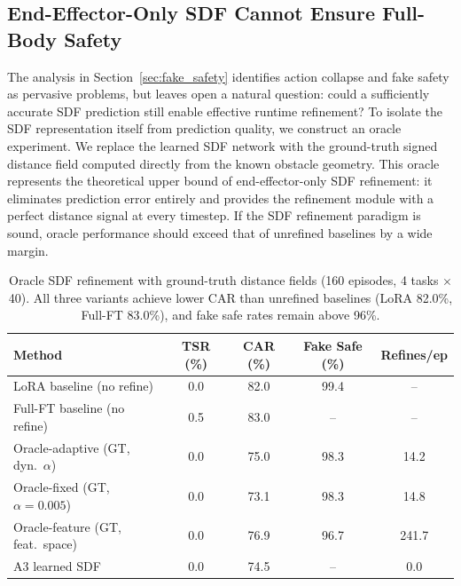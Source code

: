 \subsection{End-Effector-Only SDF Cannot Ensure Full-Body Safety}\label{sec:ee_only}

The analysis in Section~\ref{sec:fake_safety} identifies action collapse and fake safety as pervasive problems, but leaves open a natural question: could a sufficiently accurate SDF prediction still enable effective runtime refinement? To isolate the SDF representation itself from prediction quality, we construct an oracle experiment. We replace the learned SDF network with the ground-truth signed distance field computed directly from the known obstacle geometry. This oracle represents the theoretical upper bound of end-effector-only SDF refinement: it eliminates prediction error entirely and provides the refinement module with a perfect distance signal at every timestep. If the SDF refinement paradigm is sound, oracle performance should exceed that of unrefined baselines by a wide margin.

\begin{table}[t]
\centering
\caption{Oracle SDF refinement with ground-truth distance fields (160 episodes, 4 tasks $\times$ 40). All three variants achieve lower CAR than unrefined baselines (LoRA 82.0\%, Full-FT 83.0\%), and fake safe rates remain above 96\%.}
\label{tab:oracle}
\vspace{2pt}
\small
\begin{tabular}{lcccc}
\toprule
Method & TSR (\%) & CAR (\%) & Fake Safe (\%) & Refines/ep \\
\midrule
LoRA baseline (no refine) & 0.0 & 82.0 & 99.4 & -- \\
Full-FT baseline (no refine) & 0.5 & 83.0 & -- & -- \\
\midrule
Oracle-adaptive (GT, dyn.\ $\alpha$) & 0.0 & 75.0 & 98.3 & 14.2 \\
Oracle-fixed (GT, $\alpha{=}0.005$) & 0.0 & 73.1 & 98.3 & 14.8 \\
Oracle-feature (GT, feat.\ space) & 0.0 & 76.9 & 96.7 & 241.7 \\
\midrule
A3 learned SDF & 0.0 & 74.5 & -- & 0.0 \\
\bottomrule
\end{tabular}
\end{table}

